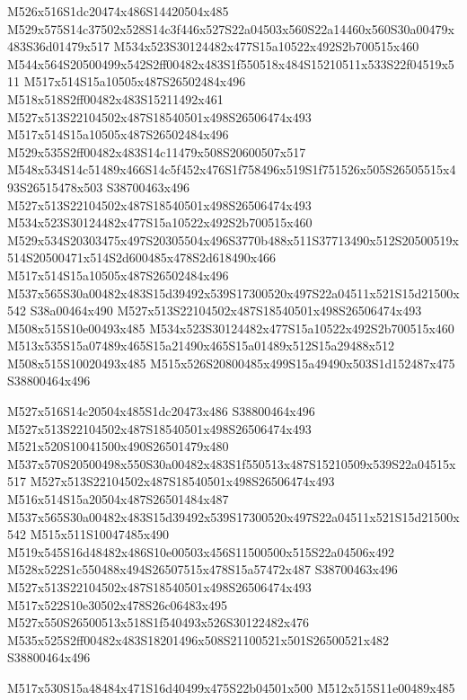 \documentclass{article}
\begin{document}
\begin{multicols}{2}
M526x516S1dc20474x486S14420504x485 M529x575S14c37502x528S14c3f446x527S22a04503x560S22a14460x560S30a00479x483S36d01479x517 M534x523S30124482x477S15a10522x492S2b700515x460 M544x564S20500499x542S2ff00482x483S1f550518x484S15210511x533S22f04519x511 M517x514S15a10505x487S26502484x496 M518x518S2ff00482x483S15211492x461 M527x513S22104502x487S18540501x498S26506474x493 M517x514S15a10505x487S26502484x496 M529x535S2ff00482x483S14c11479x508S20600507x517 M548x534S14c51489x466S14c5f452x476S1f758496x519S1f751526x505S26505515x493S26515478x503 S38700463x496 M527x513S22104502x487S18540501x498S26506474x493 M534x523S30124482x477S15a10522x492S2b700515x460 M529x534S20303475x497S20305504x496S3770b488x511S37713490x512S20500519x514S20500471x514S2d600485x478S2d618490x466 M517x514S15a10505x487S26502484x496 M537x565S30a00482x483S15d39492x539S17300520x497S22a04511x521S15d21500x542 S38a00464x490 M527x513S22104502x487S18540501x498S26506474x493 M508x515S10e00493x485 M534x523S30124482x477S15a10522x492S2b700515x460 M513x535S15a07489x465S15a21490x465S15a01489x512S15a29488x512 M508x515S10020493x485 M515x526S20800485x499S15a49490x503S1d152487x475 S38800464x496

M527x516S14c20504x485S1dc20473x486 S38800464x496 M527x513S22104502x487S18540501x498S26506474x493 M521x520S10041500x490S26501479x480 M537x570S20500498x550S30a00482x483S1f550513x487S15210509x539S22a04515x517 M527x513S22104502x487S18540501x498S26506474x493 M516x514S15a20504x487S26501484x487 M537x565S30a00482x483S15d39492x539S17300520x497S22a04511x521S15d21500x542 M515x511S10047485x490 M519x545S16d48482x486S10e00503x456S11500500x515S22a04506x492 M528x522S1c550488x494S26507515x478S15a57472x487 S38700463x496 M527x513S22104502x487S18540501x498S26506474x493 M517x522S10e30502x478S26c06483x495 M527x550S26500513x518S1f540493x526S30122482x476 M535x525S2ff00482x483S18201496x508S21100521x501S26500521x482 S38800464x496

\begin{center}
M517x530S15a48484x471S16d40499x475S22b04501x500 M512x515S11e00489x485 
\end{center}



\end{multicols}
\end{document}
